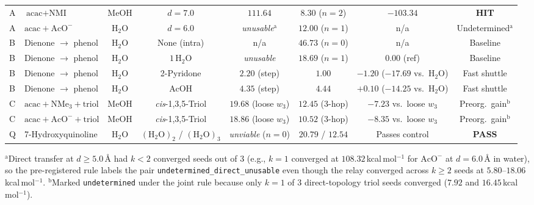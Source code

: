 \documentclass[11pt,a4paper]{article}
\begin{document}
\begin{table}[htbp]
{\begin{tabular}{@{}llcccccc@{}}
A & $\text{acac} + \text{NMI}$ & MeOH & $d = 7.0$ & $111.64$ & $\mathbf{8.30}$ ($n=2$) & $\mathbf{-103.34}$ & \textbf{HIT} \\
A & $\text{acac} + \text{AcO}^-$ & $\text{H}_2\text{O}$ & $d = 6.0$ & \textit{unusable}$^{\text{a}}$ & $\mathbf{12.00}$ ($n=1$) & n/a & Undetermined$^{\text{a}}$ \\
\midrule
B & Dienone $\to$ phenol & $\text{H}_2\text{O}$ & None (intra) & n/a & $46.73$ ($n=0$) & n/a & Baseline \\
B & Dienone $\to$ phenol & $\text{H}_2\text{O}$ & $1\,\text{H}_2\text{O}$ & \textit{unusable} & $18.69$ ($n=1$) & $0.00$ (ref) & Baseline \\
B & Dienone $\to$ phenol & $\text{H}_2\text{O}$ & 2-Pyridone & $2.20$ (step) & $\mathbf{1.00}$ & $-1.20$ ($-17.69$ vs.\ $\text{H}_2\text{O}$) & Fast shuttle \\
B & Dienone $\to$ phenol & $\text{H}_2\text{O}$ & AcOH & $4.35$ (step) & $\mathbf{4.44}$ & $+0.10$ ($-14.25$ vs.\ $\text{H}_2\text{O}$) & Fast shuttle \\
\midrule
C & $\text{acac} + \text{NMe}_3 + \text{triol}$ & MeOH & \textit{cis}-1,3,5-Triol & $19.68$ (loose $w_3$) & $\mathbf{12.45}$ (3-hop) & $\mathbf{-7.23}$ vs.\ loose $w_3$ & Preorg.\ gain$^{\text{b}}$ \\
C & $\text{acac} + \text{AcO}^- + \text{triol}$ & MeOH & \textit{cis}-1,3,5-Triol & $18.86$ (loose $w_3$) & $\mathbf{10.52}$ (3-hop) & $\mathbf{-8.35}$ vs.\ loose $w_3$ & Preorg.\ gain$^{\text{b}}$ \\
\midrule
Q & 7-Hydroxyquinoline & $\text{H}_2\text{O}$ & $(\text{H}_2\text{O})_2$ / $(\text{H}_2\text{O})_3$ & \textit{unviable} ($n=0$) & $\mathbf{20.79}$ / $\mathbf{12.54}$ & Passes control & \textbf{PASS} \\
\bottomrule
\end{tabular}}
\begin{flushleft}
\footnotesize $^{\text{a}}$Direct transfer at $d \ge 5.0$\,\AA{} had $k < 2$ converged seeds out of 3 (e.g., $k=1$ converged at $108.32$\,kcal\,mol$^{-1}$ for $\text{AcO}^-$ at $d=6.0$\,\AA{} in water), so the pre-registered rule labels the pair \texttt{undetermined\_direct\_unusable} even though the relay converged across $k \ge 2$ seeds at $5.80$--$18.06$\,kcal\,mol$^{-1}$. $^{\text{b}}$Marked \texttt{undetermined} under the joint rule because only $k=1$ of 3 direct-topology triol seeds converged ($7.92$ and $16.45$\,kcal\,mol$^{-1}$).
\end{flushleft}
\end{table}
\end{document}

